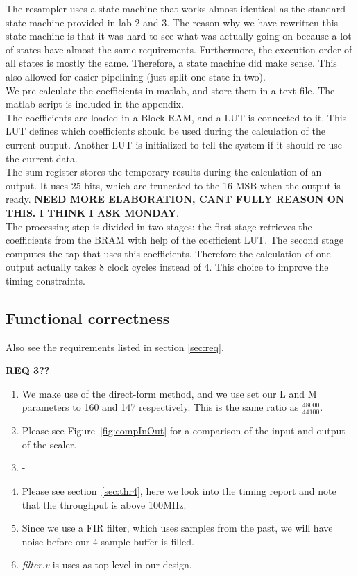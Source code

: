 \documentclass[a4paper,twoside,11pt, fleqn]{article}
\begin{document}
The resampler uses a state machine that works almost identical as the standard state machine provided in lab 2 and 3. The reason why we have rewritten this state machine is that it was hard to see what was actually going on because a lot of states have almost the same requirements. Furthermore, the execution order of all states is mostly the same. Therefore, a state machine did make sense. This also allowed for easier pipelining (just split one state in two).\\

We pre-calculate the coefficients in matlab, and store them in a text-file. The matlab script is included in the appendix.\\

The coefficients are loaded in a Block RAM, and a LUT is connected to it. This LUT defines which coefficients should be used during the calculation of the current output. Another LUT is initialized to tell the system if it should re-use the current data.\\

The sum register stores the temporary results during the calculation of an output. It uses 25 bits, which are truncated to the 16 MSB when the output is ready. 
\textbf{NEED MORE ELABORATION, CANT FULLY REASON ON THIS. I THINK I ASK MONDAY}.\\

The processing step is divided in two stages: the first stage retrieves the coefficients from the BRAM with help of the coefficient LUT. The second stage computes the tap that uses this coefficients. Therefore the calculation of one output actually takes 8 clock cycles instead of 4. This choice to improve the timing constraints.

\subsection{Functional correctness}
Also see the requirements listed in section \ref{sec:req}.

\textbf{REQ 3??}

\begin{enumerate}
	\item We make use of the direct-form method, and we use set our L and M parameters to 160 and 147 respectively. This is the same ratio as $\frac{48000}{44100}$.
	\item Please see Figure~\ref{fig:compInOut} for a comparison of the input and output of the scaler.
	\item -
	\item Please see section~\ref{sec:thr4}, here we look into the timing report and note that the throughput is above 100MHz.
	\item Since we use a FIR filter, which uses samples from the past, we will have noise before our 4-sample buffer is filled.
	\item \textit{filter.v} is uses as top-level in our design.
\end{enumerate}
\end{document}
